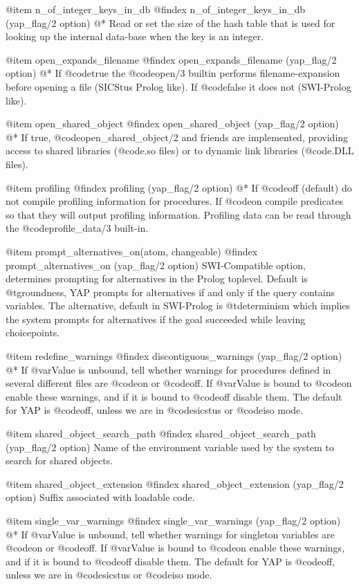 {{{{{{{{{@item n_of_integer_keys_in_db
@findex n_of_integer_keys_in_db (yap_flag/2 option)
@*
Read or set the size of the hash table that is used for looking up the
internal data-base when the key is an integer.

@item open_expands_filename
@findex open_expands_filename (yap_flag/2 option)
@*
If @code{true} the @code{open/3} builtin performs filename-expansion
before opening a file (SICStus Prolog like). If @code{false} it does not
(SWI-Prolog like).

@item open_shared_object
@findex open_shared_object (yap_flag/2 option)
@*
If true, @code{open_shared_object/2} and friends are implemented,
providing access to shared libraries (@code{.so} files) or to dynamic link
libraries (@code{.DLL} files).

@item  profiling
@findex profiling (yap_flag/2 option)
@*
If @code{off} (default) do not compile profiling information for
procedures. If @code{on} compile predicates so that they will output
profiling information. Profiling data can be read through the
@code{profile_data/3} built-in.

@item  prompt_alternatives_on(atom, changeable)
@findex  prompt_alternatives_on  (yap_flag/2 option)
SWI-Compatible option, determines prompting for alternatives in the Prolog toplevel. Default is @t{groundness}, YAP prompts for alternatives if and only if the query contains variables. The alternative, default in SWI-Prolog is @t{determinism} which implies the system prompts for alternatives if the goal succeeded while leaving choicepoints.


@item redefine_warnings
@findex discontiguous_warnings (yap_flag/2 option)
@*
If @var{Value} is unbound, tell whether warnings for procedures defined
in several different files are @code{on} or
@code{off}. If @var{Value} is bound to @code{on} enable these warnings,
and if it is bound to @code{off} disable them. The default for YAP is
@code{off}, unless we are in @code{sicstus} or @code{iso} mode.

@item shared_object_search_path
@findex shared_object_search_path (yap_flag/2 option)
Name of the environment variable used by the system to search for shared
objects.

@item shared_object_extension
@findex shared_object_extension (yap_flag/2 option)
Suffix associated with loadable code.

@item single_var_warnings
@findex single_var_warnings (yap_flag/2 option)
@*
If @var{Value} is unbound, tell whether warnings for singleton variables
are @code{on} or @code{off}. If @var{Value} is bound to @code{on} enable
these warnings, and if it is bound to @code{off} disable them. The
default for YAP is @code{off}, unless we are in @code{sicstus} or
@code{iso} mode.

}}}}}}}}}
